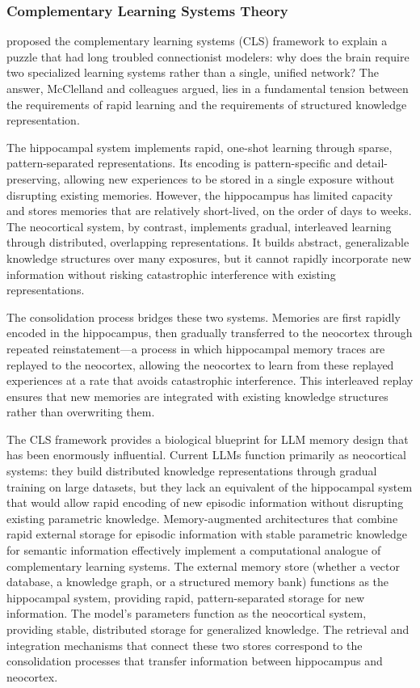 \subsubsection{Complementary Learning Systems Theory}

\citet{mcclelland1995complementary} proposed the complementary learning systems (CLS) framework to explain a puzzle that had long troubled connectionist modelers: why does the brain require two specialized learning systems rather than a single, unified network? The answer, McClelland and colleagues argued, lies in a fundamental tension between the requirements of rapid learning and the requirements of structured knowledge representation.

The hippocampal system implements rapid, one-shot learning through sparse, pattern-separated representations. Its encoding is pattern-specific and detail-preserving, allowing new experiences to be stored in a single exposure without disrupting existing memories. However, the hippocampus has limited capacity and stores memories that are relatively short-lived, on the order of days to weeks. The neocortical system, by contrast, implements gradual, interleaved learning through distributed, overlapping representations. It builds abstract, generalizable knowledge structures over many exposures, but it cannot rapidly incorporate new information without risking catastrophic interference with existing representations.

The consolidation process bridges these two systems. Memories are first rapidly encoded in the hippocampus, then gradually transferred to the neocortex through repeated reinstatement---a process in which hippocampal memory traces are replayed to the neocortex, allowing the neocortex to learn from these replayed experiences at a rate that avoids catastrophic interference. This interleaved replay ensures that new memories are integrated with existing knowledge structures rather than overwriting them.

The CLS framework provides a biological blueprint for LLM memory design that has been enormously influential. Current LLMs function primarily as neocortical systems: they build distributed knowledge representations through gradual training on large datasets, but they lack an equivalent of the hippocampal system that would allow rapid encoding of new episodic information without disrupting existing parametric knowledge. Memory-augmented architectures that combine rapid external storage for episodic information with stable parametric knowledge for semantic information effectively implement a computational analogue of complementary learning systems. The external memory store (whether a vector database, a knowledge graph, or a structured memory bank) functions as the hippocampal system, providing rapid, pattern-separated storage for new information. The model's parameters function as the neocortical system, providing stable, distributed storage for generalized knowledge. The retrieval and integration mechanisms that connect these two stores correspond to the consolidation processes that transfer information between hippocampus and neocortex.

